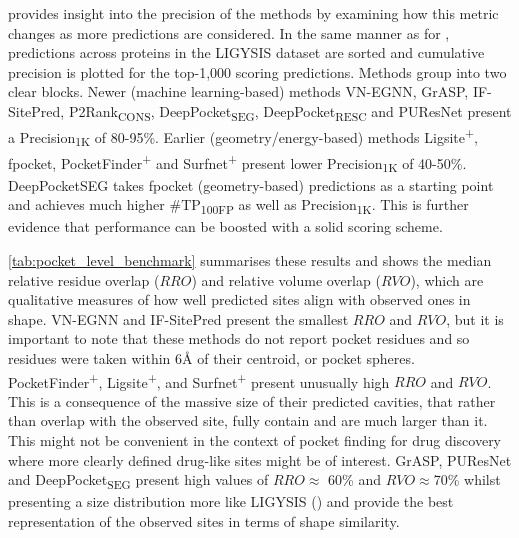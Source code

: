  provides insight into the precision of the methods by examining how this metric changes as more predictions are considered. In the same manner as for , predictions across proteins in the LIGYSIS dataset are sorted and cumulative precision is plotted for the top-1,000 scoring predictions. Methods group into two clear blocks. Newer (machine learning-based) methods VN-EGNN, GrASP, IF-SitePred, P2Rank\textsubscript{CONS}, DeepPocket\textsubscript{SEG}, DeepPocket\textsubscript{RESC} and PUResNet present a Precision\textsubscript{1K} of 80-95\%. Earlier (geometry/energy-based) methods Ligsite\textsuperscript{+}, fpocket, PocketFinder\textsuperscript{+} and Surfnet\textsuperscript{+} present lower Precision\textsubscript{1K} of 40-50\%. DeepPocketSEG takes fpocket (geometry-based) predictions as a starting point and achieves much higher \#TP\textsubscript{100FP} as well as Precision\textsubscript{1K}. This is further evidence that performance can be boosted with a solid scoring scheme.

\autoref{tab:pocket_level_benchmark} summarises these results and shows the median relative residue overlap ($RRO$) and relative volume overlap ($RVO$), which are qualitative measures of how well predicted sites align with observed ones in shape. VN-EGNN and IF-SitePred present the smallest $RRO$ and $RVO$, but it is important to note that these methods do not report pocket residues and so residues were taken within 6Å of their centroid, or pocket spheres. PocketFinder\textsuperscript{+}, Ligsite\textsuperscript{+}, and Surfnet\textsuperscript{+} present unusually high $RRO$ and $RVO$. This is a consequence of the massive size of their predicted cavities, that rather than overlap with the observed site, fully contain and are much larger than it. This might not be convenient in the context of pocket finding for drug discovery where more clearly defined drug-like sites might be of interest. GrASP, PUResNet and DeepPocket\textsubscript{SEG} present high values of $RRO \approx$ 60\% and $RVO \approx $70\% whilst presenting a size distribution more like LIGYSIS () and provide the best representation of the observed sites in terms of shape similarity.

